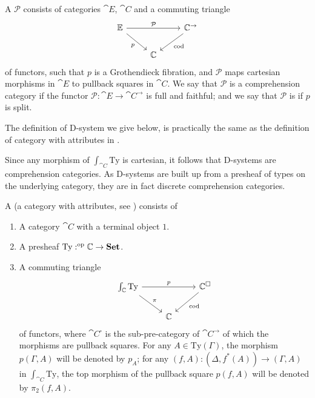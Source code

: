 \begin{defn}
A  $\mathcal{P}$ consists of categories $\cat{E}$, $\cat{C}$ and a
commuting triangle
\begin{equation*}
\begin{tikzcd}
\cat{E} \arrow[rr,"\mathcal{P}"] \arrow[dr,swap,"p"] & & \cat{C}^{\to} \arrow[dl,"\mathrm{cod}"] \\
& \cat{C}
\end{tikzcd}
\end{equation*}
of functors, such that $p$ is a Grothendieck fibration, and $\mathcal{P}$ maps
cartesian morphisms in $\cat{E}$ to pullback squares in $\cat{C}$. We say that
$\mathcal{P}$ is a  comprehension category if the functor $\mathcal{P}:
\cat{E}\to\cat{C}^{\to}$ is full and faithful; and we say that
$\mathcal{P}$ is  if $p$ is split.
\end{defn}

The definition of D-system we give below, is practically the same as the definition
of category with attributes in \cite[Definition 3.10]{Hofmann_syntax_semantics}.

\begin{rmk}
Since any morphism of $\int_{\cat{C}}\mathrm{Ty}$ is cartesian, it follows that D-systems
are comprehension categories. As D-systems are built up from a presheaf of types
on the underlying category, they are in fact discrete comprehension categories.
\end{rmk}

\begin{defn}
A  (a category with attributes, see \cite{Hofmann_syntax_semantics}) consists of
\begin{enumerate}
\item A category $\cat{C}$ with a terminal object $1$.
\item A presheaf $\mathrm{Ty}:^{\mathrm{op}}{\mathbb{C}}\to\mathbf{Set}$. 
\item A commuting triangle
\begin{equation*}
\begin{tikzcd}
\int_{\cat{C}}\mathrm{Ty} \arrow[rr,"p"] \arrow[dr,"\pi"] & & \cat{C}^\square \arrow[dl,"\mathrm{cod}"] \\
& \cat{C}
\end{tikzcd}
\end{equation*}
of functors, where $\cat{C}^\square$ is the sub-pre-category of $\cat{C}^{\to}$ of
which the morphisms are pullback squares. For any $A\in\mathrm{Ty}(\Gamma)$,
the morphism $p(\Gamma,A)$ will be denoted by $p_A$; for any
$(f,A):(\Delta,f^\ast(A))\to(\Gamma,A)$ in $\int_{\cat{C}}\mathrm{Ty}$, the top
morphism of the pullback square $p(f,A)$ will be denoted by $\pi_2(f,A)$.
\end{enumerate}
\end{defn}

